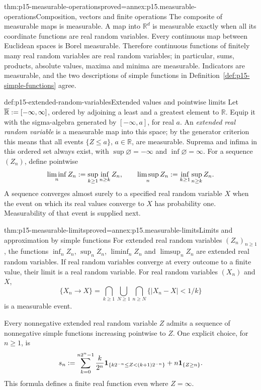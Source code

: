 \begin{hbtheorem}{thm:p15-measurable-operations}{proved=annex:p15.measurable-operations}{Composition, vectors and finite operations}
The composite of measurable maps is measurable. A map into
\(\mathbb R^d\) is measurable exactly when all its coordinate
functions are real random variables. Every continuous map between
Euclidean spaces is Borel measurable. Therefore continuous functions
of finitely many real random variables are real random variables;
in particular, sums, products, absolute values, maxima and minima are
measurable. Indicators are measurable, and the two descriptions of
simple functions in Definition~\ref{def:p15-simple-functions} agree.
\end{hbtheorem}

\begin{hbdefinition}{def:p15-extended-random-variables}{Extended values and pointwise limits}
Let \(\overline{\mathbb R}\mathrel{:=}[-\infty,\infty]\), ordered by
adjoining a least and a greatest element to \(\mathbb R\). Equip it
with the sigma-algebra generated by \([-\infty,a]\), for real \(a\).
An \emph{extended real random variable} is a measurable map into this
space; by the generator criterion this means that all events
\(\{Z\leq a\}\), \(a\in\mathbb R\), are measurable.
Suprema and infima in this ordered set always exist, with
\(\sup\varnothing=-\infty\) and \(\inf\varnothing=\infty\).
For a sequence \((Z_n)\), define pointwise
\[
 \liminf_n Z_n\mathrel{:=}\sup_{k\geq1}\inf_{n\geq k}Z_n,
 \qquad
 \limsup_n Z_n\mathrel{:=}\inf_{k\geq1}\sup_{n\geq k}Z_n.
\]
A sequence converges almost surely to a specified real random variable
\(X\) when the event on which its real values converge to \(X\)
has probability one. Measurability of that event is supplied next.
\end{hbdefinition}

\begin{hbtheorem}{thm:p15-measurable-limits}{proved=annex:p15.measurable-limits}{Limits and approximation by simple functions}
For extended real random variables \((Z_n)_{n\geq1}\), the functions
\(\inf_n Z_n\), \(\sup_n Z_n\), \(\liminf_n Z_n\) and
\(\limsup_n Z_n\) are extended real random variables. If real random
variables converge at every outcome to a finite value, their limit is
a real random variable. For real random variables \((X_n)\) and \(X\),
\[
 \{X_n\to X\}=
 \bigcap_{k\geq1}\bigcup_{N\geq1}\bigcap_{n\geq N}
       \{|X_n-X|<1/k\}
\]
is a measurable event.

Every nonnegative extended real random variable \(Z\) admits a
sequence of nonnegative simple functions increasing pointwise to \(Z\).
One explicit choice, for \(n\geq1\), is
\[
 s_n\mathrel{:=}
 \sum_{k=0}^{n2^n-1}\frac{k}{2^n}
    \mathbf1_{\{k2^{-n}\leq Z<(k+1)2^{-n}\}}
       +n\mathbf1_{\{Z\geq n\}}.
\]
This formula defines a finite real function even where \(Z=\infty\).
\end{hbtheorem}

